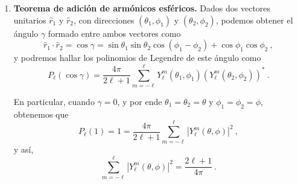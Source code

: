 \begin{propiedad}
\begin{enumerate}
        \item \textbf{Teorema de adición de armónicos esféricos.} Dados dos vectores unitarios $\hat{r}_1$ y $\hat{r}_2$, con direcciones $(\theta_1, \phi_1)$ y $(\theta_2, \phi_2)$, podemos obtener el ángulo $\gamma$ formado entre ambos vectores como
        \begin{equation}
            \hat{r}_1 \cdot \hat{r}_2 = \cos\gamma = \sin\theta_1 \sin\theta_2 \cos(\phi_1 - \phi_2) + \cos\phi_1 \cos\phi_2 \ ,
        \end{equation}
        y podremos hallar los polinomios de Legendre de este ángulo como
        \begin{equation}
            P_\ell(\cos\gamma) = \frac{4\pi}{2\ell + 1} \sum_{m = -\ell}^\ell Y_\ell^m(\theta_1, \phi_1) (Y_\ell^m(\theta_2, \phi_2))^\ast \ .
        \end{equation}
    
        En particular, cuando $\gamma=0$, y por ende $\theta_1 = \theta_2 = \theta$ y $\phi_1 = \phi_2 = \phi$, obtenemos que
        \begin{equation}
            P_\ell(1) = 1 = \frac{4\pi}{2\ell + 1} \sum_{m = -\ell}^\ell |Y_\ell^m(\theta, \phi)|^2 \ ,
        \end{equation}
        y así,
        \begin{equation}
            \sum_{m = -\ell}^\ell |Y_\ell^m(\theta, \phi)|^2 = \frac{2\ell + 1}{4\pi} \ .
        \end{equation}
    
    \end{enumerate}
\end{propiedad}

\begin{ejemplo}
    
\end{ejemplo}
